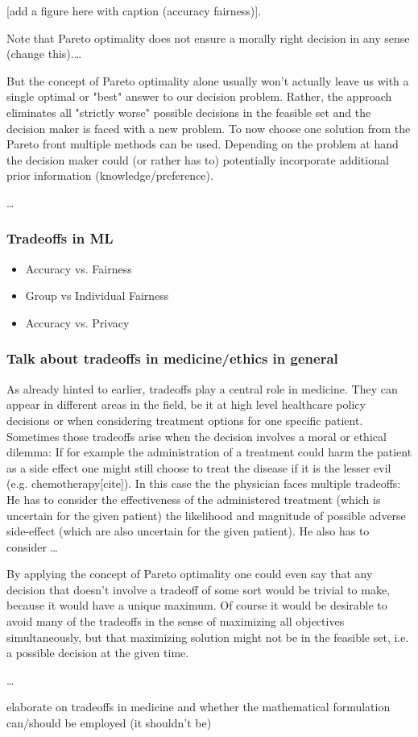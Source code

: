 	[add a figure here with caption (accuracy fairness)].

	Note that Pareto optimality does not ensure a morally right decision in any sense (change this).\dots

	But the concept of Pareto optimality alone usually won't actually leave us with a single optimal or "best" answer to our decision problem.
	Rather, the approach eliminates all "strictly worse" possible decisions in the feasible set and the decision maker is faced with a new problem.
	To now choose one solution from the Pareto front multiple methods can be used.
	Depending on the problem at hand the decision maker could (or rather has to) potentially incorporate additional prior information (knowledge/preference).

	\dots


	\subsubsection{Tradeoffs in ML}
	\begin{itemize}
	\item Accuracy vs. Fairness
	\item Group vs Individual Fairness
	\item Accuracy vs. Privacy
	\end{itemize}


	\subsubsection{Talk about tradeoffs in medicine/ethics in general}
	As already hinted to earlier, tradeoffs play a central role in medicine.
	They can appear in different areas in the field, be it at high level healthcare policy decisions or when considering treatment options for one specific patient.
	Sometimes those tradeoffs arise when the decision involves a moral or ethical dilemma:
	If for example the administration of a treatment could harm the patient as a side effect one might still choose to treat the disease if it is the lesser evil (e.g. chemotherapy[cite]).
	In this case the the physician faces multiple tradeoffs:
	He has to consider the effectiveness of the administered treatment (which is uncertain for the given patient) the likelihood and magnitude of possible adverse side-effect (which are also uncertain for the given patient).
	He also has to consider \dots
	
	By applying the concept of Pareto optimality one could even say that any decision that doesn't involve a tradeoff of some sort would be trivial to make, because it would have a unique maximum.
	Of course it would be desirable to avoid many of the tradeoffs in the sense of maximizing all objectives simultaneously, but that maximizing solution might not be in the feasible set, i.e. a possible decision at the given time.

	\dots

	

	elaborate on tradeoffs in medicine and whether the mathematical formulation can/should be employed (it shouldn't be)
